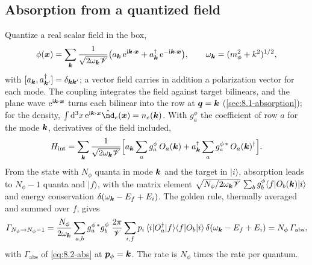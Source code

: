 \subsection{Absorption from a quantized field}

Quantize a real scalar field in the box,
\begin{equation*}
  \phi(\bm{x}) = \sum_{\bm{k}}\frac{1}{\sqrt{2\omega_{\bm{k}}\mathscr{V}}}\bigl(a_{\bm{k}}\,\mathrm{e}^{\mathrm{i}\bm{k}\cdot\bm{x}} + a_{\bm{k}}^\dagger\,\mathrm{e}^{-\mathrm{i}\bm{k}\cdot\bm{x}}\bigr), \qquad \omega_{\bm{k}} = (m_\phi^2 + k^2)^{1/2} ,
\end{equation*}
with $[a_{\bm{k}}, a_{\bm{k}'}^\dagger] = \delta_{\bm{k}\bm{k}'}$; a vector field carries in addition a polarization vector for each mode. The coupling integrates the field against target bilinears, and the plane wave $\mathrm{e}^{\mathrm{i}\bm{k}\cdot\bm{x}}$ turns each bilinear into the row at $\bm{q} = \bm{k}$ (\cref{sec:8.1-absorption}); for the density, $\int\dd^3x\,\ee^{\ii\vect{k}\cdot\vect{x}}\op{\nd}_e(\vect{x}) = n_e(\vect{k})$. With $g^\phi_a$ the coefficient of row $a$ for the mode $\bm{k}$, derivatives of the field included,
\begin{equation*}
  H_{\mathrm{int}} = \sum_{\bm{k}}\frac{1}{\sqrt{2\omega_{\bm{k}}\mathscr{V}}}\Bigl[a_{\bm{k}}\sum_ag^\phi_a\,O_a(\bm{k}) + a_{\bm{k}}^\dagger\sum_ag^{\phi\,*}_a\,O_a(\bm{k})^\dagger\Bigr] .
\end{equation*}
From the state with $N_\phi$ quanta in mode $\bm{k}$ and the target in $|i\rangle$, absorption leads to $N_\phi - 1$ quanta and $|f\rangle$, with the matrix element $\sqrt{N_\phi/2\omega_{\bm{k}}\mathscr{V}}\,\sum_bg^\phi_b\langle f|O_b(\bm{k})|i\rangle$ and energy conservation $\delta(\omega_{\bm{k}} - E_f + E_i)$. The golden rule, thermally averaged and summed over $f$, gives
\begin{equation*}
  \varGamma_{N_\phi\to N_\phi-1} = \frac{N_\phi}{2\omega_{\bm{k}}}\sum_{a,b}g^{\phi\,*}_ag^\phi_b\;\frac{2\pi}{\mathscr{V}}\sum_{i,f}p_i\,\langle i|O_a^\dagger|f\rangle\langle f|O_b|i\rangle\,\delta(\omega_{\bm{k}} - E_f + E_i) = N_\phi\,\varGamma_{\mathrm{abs}} ,
\end{equation*}
with $\varGamma_{\mathrm{abs}}$ of \cref{eq:8.2-abs} at $\bm{p}_\phi = \bm{k}$. The rate is $N_\phi$ times the rate per quantum.

